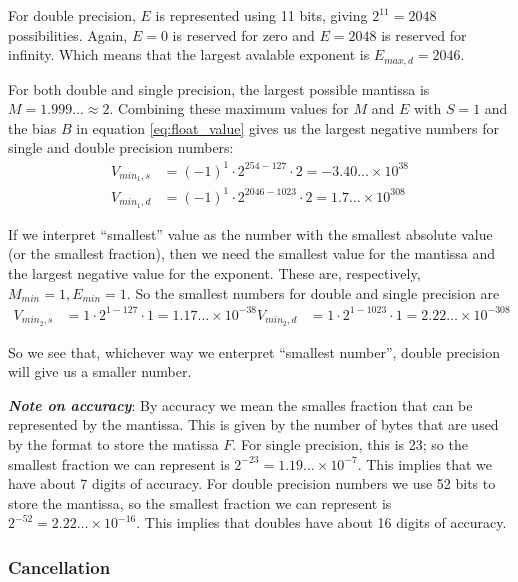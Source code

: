 For double precision, $E$ is represented using 11 bits, giving $2^{11}=2048$ possibilities. Again, $E=0$ is reserved for zero and $E=2048$ is reserved for infinity. Which means that the largest avalable exponent is $E_{max,d}=2046$.

For both double and single precision, the largest possible mantissa is $M=1.999\dots \approx 2$. Combining these maximum values for $M$ and $E$ with $S=1$ and the bias $B$ in equation \eqref{eq:float_value} gives us the largest negative numbers for single and double precision numbers:
\begin{align}
    V_{min_1, s} &= (-1)^1 \cdot 2^{254-127} \cdot 2 = -3.40\dots\times 10^{38} \\
    V_{min_1, d} &= (-1)^1 \cdot 2^{2046-1023} \cdot 2 = 1.7\dots \times 10^{308}
\end{align}

If we interpret ``smallest'' value as the number with the smallest absolute value (or the smallest fraction), then we need the smallest value for the mantissa and the largest negative value for the exponent. These are, respectively, $M_{min} = 1, E_{min} = 1$. So the smallest numbers for double and single precision are
\begin{align}
    V_{min_2, s} &= 1 \cdot 2^{1-127} \cdot 1 = 1.17\dots \times 10^{-38}
    V_{min_2, d} &= 1 \cdot 2^{1-1023} \cdot 1 = 2.22\dots \times 10^{-308}
\end{align}

So we see that, whichever way we enterpret ``smallest number'', double precision will give us a smaller number.

\vspace*{1em}\noindent \textbf{\emph{Note on accuracy}}: By accuracy we mean the smalles fraction that can be represented by the mantissa. This is given by the number of bytes that are used by the format to store the matissa $F$. For single precision, this is 23; so the smallest fraction we can represent is $2^{-23} = 1.19\dots \times 10^{-7}$. This implies that we have about 7 digits of accuracy. For double precision numbers we use 52 bits to store the mantissa, so the smallest fraction we can represent is $2^{-52}=2.22\dots \times 10^{-16}$. This implies that doubles have about 16 digits of accuracy.

\subsubsection{Cancellation} %
\label{ssub:cancellation}

